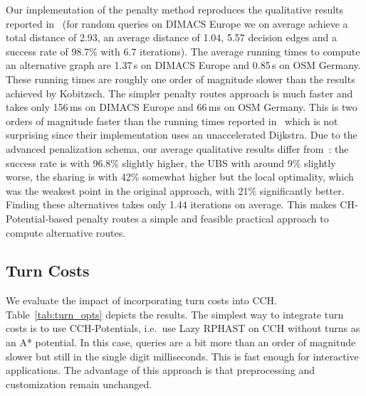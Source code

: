 \documentclass[a4paper, english, cleveref]{lipics-v2021}
\begin{document}
Our implementation of the penalty method reproduces the qualitative results reported in~\cite{kobitzsch2015alternative} (for random queries on DIMACS Europe we on average achieve a total distance of 2.93, an average distance of 1.04, 5.57 decision edges and a success rate of 98.7\% with 6.7 iterations).
The average running times to compute an alternative graph are 1.37\,s on DIMACS Europe and 0.85\,s on OSM Germany.
These running times are roughly one order of magnitude slower than the results achieved by Kobitzsch.
The simpler penalty routes approach is much faster and takes only 156\,ms on DIMACS Europe and 66\,ms on OSM Germany.
This is two orders of magnitude faster than the running times reported in~\cite{adgw-arrn-13} which is not surprising since their implementation uses an unaccelerated Dijkstra.
Due to the advanced penalization schema, our average qualitative results differ from~\cite{adgw-arrn-13}: the success rate is with 96.8\% slightly higher, the UBS with around 9\% slightly worse, the sharing is with 42\% somewhat higher but the local optimality, which was the weakest point in the original approach, with 21\% significantly better.
Finding these alternatives takes only 1.44 iterations on average.
This makes CH-Potential-based penalty routes a simple and feasible practical approach to compute alternative routes.

\subsection{Turn Costs}

\begin{table}
\centering
\caption{
Performance of different CCH variants and optimizations to support turn costs.
We report the number of directed edges in the augmented graph as well as running times for each phase.
Directed hierarchies imply the removal of infinite shortcuts and reordering separator vertices builds on both directed hierarchies and the removal of infinite shortcuts and all three variants used a cut order.
}\label{tab:turn_opts}

\end{table}

We evaluate the impact of incorporating turn costs into CCH.
Table~\ref{tab:turn_opts} depicts the results.
The simplest way to integrate turn costs is to use CCH-Potentials, i.e.\ use Lazy RPHAST on CCH without turns as an A* potential.
In this case, queries are a bit more than an order of magnitude slower but still in the single digit milliseconds.
This is fast enough for interactive applications.
The advantage of this approach is that preprocessing and customization remain unchanged.
\end{document}
